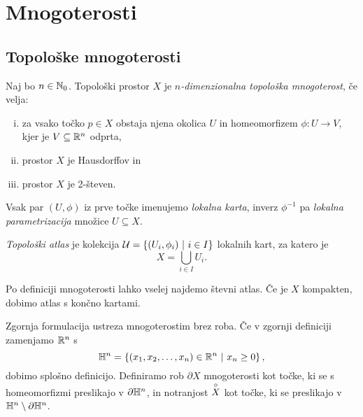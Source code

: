 \section{Mnogoterosti}

\subsection{Topološke mnogoterosti}


\begin{definicija}
Naj bo $n \in \mathbb{N}_0$. Topološki prostor $X$ je
\emph{$n$-dimenzionalna topološka mnogoterost},
če velja:

\begin{enumerate}[i)]
\item za vsako točko $p \in X$ obstaja njena okolica $U$ in
homeomorfizem $\phi \colon U \to V$, kjer je $V \subseteq \mathbb{R}^n$
odprta,
\item prostor $X$ je Hausdorffov in
\item prostor $X$ je 2-števen.
\end{enumerate}

Vsak par $(U, \phi)$ iz prve točke imenujemo
\emph{lokalna karta}, inverz $\phi^{-1}$ pa
\emph{lokalna parametrizacija}
množice $U \subseteq X$.
\end{definicija}

\begin{definicija}
\emph{Topološki atlas} je kolekcija
$\mathcal{U} = \left\{(U_i, \phi_i)~\middle\vert~i \in I\right\}$ lokalnih kart, za
katero je
\[
X = \bigcup_{i \in I} U_i.
\]
\end{definicija}

\begin{opomba}
Po definiciji mnogoterosti lahko vselej najdemo števni atlas. Če je
$X$ kompakten, dobimo atlas s končno kartami.
\end{opomba}


\begin{opomba}
Zgornja formulacija ustreza mnogoterostim brez roba. Če v zgornji
definiciji zamenjamo $\mathbb{R}^n$ s
\[
\mathbb{H}^n = \left\{(x_1,x_2,\dots,x_n) \in \mathbb{R}^n~\middle\vert~x_n \geq 0\right\},
\]
dobimo splošno definicijo. Definiramo rob $\partial X$ mnogoterosti
kot točke, ki se s homeomorfizmi preslikajo v $\partial \mathbb{H}^n$, in
notranjost $\overset{\circ}{X}$ kot točke, ki se preslikajo v
$\mathbb{H}^n \setminus \partial \mathbb{H}^n$.
\end{opomba}


